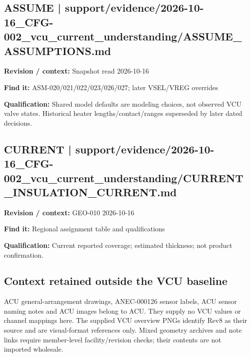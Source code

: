 \documentclass[11pt]{article}
\begin{document}
\par\noindent\begin{minipage}{\textwidth}\small
\subsection*{ASSUME | support/evidence/2026-10-16\_\allowbreak{}CFG-002\_\allowbreak{}vcu\_\allowbreak{}current\_\allowbreak{}understanding/ASSUME\_\allowbreak{}ASSUMPTIONS.md}
\textbf{Revision / context:} Snapshot read 2026-10-16\par
\textbf{Find it:} ASM-020/021/022/023/026/027; later VSEL/VREG overrides\par
\textbf{Qualification:} Shared model defaults are modeling choices, not observed VCU valve states. Historical heater lengths/contact/ranges superseded by later dated decisions.\par
\end{minipage}\par\vspace{5pt}
\par
\par\noindent\begin{minipage}{\textwidth}\small
\subsection*{CURRENT | support/evidence/2026-10-16\_\allowbreak{}CFG-002\_\allowbreak{}vcu\_\allowbreak{}current\_\allowbreak{}understanding/CURRENT\_\allowbreak{}INSULATION\_\allowbreak{}CURRENT.md}
\textbf{Revision / context:} GEO-010 2026-10-16\par
\textbf{Find it:} Regional assignment table and qualifications\par
\textbf{Qualification:} Current reported coverage; estimated thickness; not product confirmation.\par
\end{minipage}\par\vspace{5pt}
\subsection*{Context retained outside the VCU baseline}
ACU general-arrangement drawings, ANEC-000126 sensor labels, ACU sensor naming notes and ACU images belong to ACU. They supply no VCU values or channel mappings here. The supplied VCU overview PNGs identify Rev8 as their source and are visual-format references only. Mixed geometry archives and note links require member-level facility/revision checks; their contents are not imported wholesale.
\end{document}
